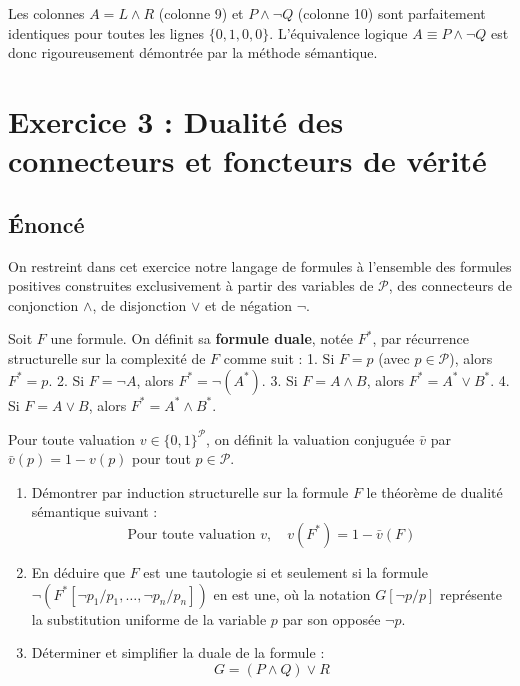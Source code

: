 \documentclass[11pt,a4paper]{article}
\begin{document}
Les colonnes \(A = L \land R\) (colonne 9) et \(P \land \neg Q\)
(colonne 10) sont parfaitement identiques pour toutes les lignes
\(\{0, 1, 0, 0\}\). L'équivalence logique \(A \equiv P \land \neg Q\)
est donc rigoureusement démontrée par la méthode sémantique.
\n
\hypertarget{exercice-3-dualituxe9-des-connecteurs-et-foncteurs-de-vuxe9rituxe9}{%
\section{Exercice 3 : Dualité des connecteurs et foncteurs de
vérité}\label{exercice-3-dualituxe9-des-connecteurs-et-foncteurs-de-vuxe9rituxe9}}

\hypertarget{uxe9noncuxe9}{%
\subsection{Énoncé}\label{uxe9noncuxe9}}

On restreint dans cet exercice notre langage de formules à l'ensemble
des formules positives construites exclusivement à partir des variables
de \(\mathcal{P}\), des connecteurs de conjonction \(\land\), de
disjonction \(\lor\) et de négation \(\neg\).

Soit \(F\) une formule. On définit sa \textbf{formule duale}, notée
\(F^*\), par récurrence structurelle sur la complexité de \(F\) comme
suit : 1. Si \(F = p\) (avec \(p \in \mathcal{P}\)), alors \(F^* = p\).
2. Si \(F = \neg A\), alors \(F^* = \neg (A^*)\). 3. Si
\(F = A \land B\), alors \(F^* = A^* \lor B^*\). 4. Si \(F = A \lor B\),
alors \(F^* = A^* \land B^*\).

Pour toute valuation \(v \in \{0, 1\}^\mathcal{P}\), on définit la
valuation conjuguée \(\bar{v}\) par \(\bar{v}(p) = 1 - v(p)\) pour tout
\(p \in \mathcal{P}\).

\begin{enumerate}
\def\labelenumi{\arabic{enumi}.}
\tightlist
\item
  Démontrer par induction structurelle sur la formule \(F\) le théorème
  de dualité sémantique suivant :
  \[\text{Pour toute valuation } v, \quad v(F^*) = 1 - \bar{v}(F)\]
\item
  En déduire que \(F\) est une tautologie si et seulement si la formule
  \(\neg (F^*[\neg p_1/p_1, \dots, \neg p_n/p_n])\) en est une, où la
  notation \(G[\neg p/p]\) représente la substitution uniforme de la
  variable \(p\) par son opposée \(\neg p\).
\item
  Déterminer et simplifier la duale de la formule :
  \[G = (P \land Q) \lor R\]
\end{enumerate}
\end{document}
